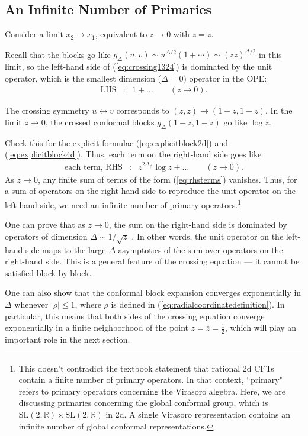 \documentclass[12pt]{article}
\numberwithin{equation}{section}
\newcommand\be{\begin{eqnarray}}
\newcommand\ee{\end{eqnarray}}
\newcommand\f\phi
\newcommand\<\langle
\renewcommand\>\rangle
\newcommand\R{\mathbb{R}}
\renewcommand\.{\cdot}
\newcommand\x\times
\newcommand\De{\Delta}
\begin{document}
\subsection{An Infinite Number of Primaries}

Consider a limit $x_2\to x_1$, equivalent to $z\to 0$ with $z=\bar z$.

Recall that the blocks go like $g_{\De}(u,v) \sim u^{\De/2}(1+\cdots) \sim (z\bar z)^{\De/2}$ in this limit, so the left-hand side of (\ref{eq:crossing1324}) is dominated by the unit operator, which is the smallest dimension ($\De = 0$) operator in the OPE:
\be
\mathrm{LHS} &:& 1+\dots \qquad(z\to 0).
\ee

The crossing symmetry $u\leftrightarrow v$ corresponds to $(z,\bar z)\to (1-z,1-\bar z)$.  In the limit $z\to 0$, the crossed conformal blocks $g_{\De}(1-z,1-z)$ go like $\log z$.

Check this for the explicit formulae (\ref{eq:explicitblock2d}) and (\ref{eq:explicitblock4d}).
Thus, each term on the right-hand side goes like
\be
\label{eq:rhsterms}
\textrm{each term, RHS} &:& z^{2\De_\f}\log z + \dots \qquad(z\to 0).
\ee
As $z\to 0$, any finite sum of terms of the form (\ref{eq:rhsterms}) vanishes.  Thus, for a sum of operators on the right-hand side to reproduce the unit operator on the left-hand side, we need an infinite number of primary operators.\footnote{This doesn't contradict the textbook statement that rational 2d CFTs contain a finite number of primary operators.  In that context, ``primary" refers to primary operators concerning the Virasoro algebra.  Here, we are discussing primaries concerning the global conformal group, which is $\mathrm{SL}(2,\R)\x\mathrm{SL}(2,\R)$ in 2d.  A single Virasoro representation contains an infinite number of global conformal representations.}

One can prove that as $z\to 0$, the sum on the right-hand side is dominated by operators of dimension $\Delta\sim 1/\sqrt z$ \cite{Pappadopulo:2012jk}.  In other words, the unit operator on the left-hand side maps to the large-$\De$ asymptotics of the sum over operators on the right-hand side.  This is a general feature of the crossing equation --- it cannot be satisfied block-by-block.

One can also show \cite{Pappadopulo:2012jk} that the conformal block expansion converges exponentially in $\De$ whenever $|\rho|\leq 1$, where $\rho$ is defined in (\ref{eq:radialcoordinatedefinition}).  In particular, this means that both sides of the crossing equation converge exponentially in a finite neighborhood of the point $z=\bar z=\frac 1 2$, which will play an important role in the next section.
\end{document}
